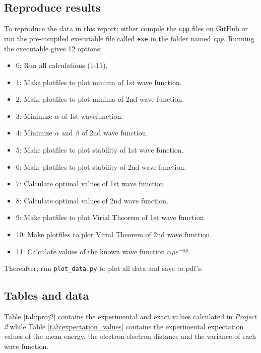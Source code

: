 \documentclass[12pt,english,a4paper]{article}
\begin{document}
\subsection{Reproduce results} \label{section:appendix:reproduce}
To reproduce the data in this report; either compile the \texttt{cpp} files on GitHub or run the pre-compiled executable file called \texttt{exe} in the folder named \textit{cpp}. Running the executable gives 12 options:

\begin{itemize}
    \renewcommand\labelitemi{--}
    \item 0: Run all calculations (1-11).
    \item 1: Make plotfiles to plot minima of 1st wave function.
    \item 2: Make plotfiles to plot minima of 2nd wave function.
    \item 3: Minimize $\alpha$ of 1st wavefunction.
    \item 4: Minimize $\alpha$ and $\beta$ of 2nd wave function.
    \item 5: Make plotfiles to plot stability of 1st wave function.
    \item 6: Make plotfiles to plot stability of 2nd wave function.
    \item 7: Calculate optimal values of 1st wave function.
    \item 8: Calculate optimal values of 2nd wave function.
    \item 9: Make plotfiles to plot Virial Theorem of 1st wave function.
    \item 10: Make plotfiles to plot Virial Theorem of 2nd wave function.
    \item 11: Calculate values of the known wave function $\alpha\rho e^{-\alpha\rho}$.
\end{itemize}

Thereafter; run \texttt{plot\_data.py} to plot all data and save to pdf's.

\subsection{Tables and data} \label{section:appendix:tables}

Table \ref{tab:proj2} contains the experimental and exact values calculated in \textit{Project 2} while Table \ref{tab:expectation_values} contains the experimental expectation values of the mean energy, the electron-electron distance and the variance of each wave function. 
\end{document}
